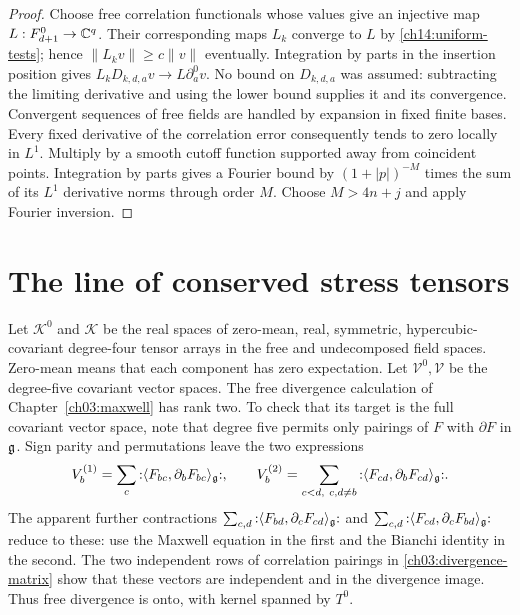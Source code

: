 \begin{proof}
Choose free correlation functionals whose values give an injective map
$L:F_{d+1}^0\to\mathbb C^q$. Their corresponding maps $L_k$
converge to $L$ by \eqref{ch14:uniform-tests}; hence
$\|L_kv\|\ge c\|v\|$ eventually. Integration by parts in the
insertion position gives
$L_k D_{k,d,a}v\to L\partial_a^0v$. No bound on
$D_{k,d,a}$ was assumed: subtracting the limiting derivative and
using the lower bound supplies it and its convergence.
Convergent sequences of free fields are handled by expansion in fixed finite bases.
Every fixed derivative of the correlation error consequently tends
to zero locally in $L^1$. Multiply by a smooth cutoff function supported
away from coincident points. Integration by parts gives a Fourier bound
by $(1+|p|)^{-M}$ times the sum of its $L^1$ derivative norms
through order $M$. Choose $M>4n+j$ and apply Fourier inversion.
\end{proof}

\section{The line of conserved stress tensors}
\label{ch14:stress-line}

Let $\mathcal K^0$ and $\mathcal K$ be the real spaces of zero-mean,
real, symmetric, hypercubic-covariant degree-four tensor arrays in
the free and undecomposed field spaces. Zero-mean means that each component
has zero expectation. Let $\mathcal V^0,\mathcal V$ be the degree-five
covariant vector spaces. The free divergence calculation of Chapter~\ref{ch03:maxwell}
has rank two. To check that its target is the full covariant vector
space, note that degree five permits only pairings of $F$ with $\partial F$ in $\mathfrak g$. Sign parity and permutations leave the two
expressions
\[
 V_b^{(1)}=\sum_c{:}\langle F_{bc},\partial_bF_{bc}\rangle_{\mathfrak g}{:},\qquad
 V_b^{(2)}=\sum_{c<d,\ c,d\ne b}{:}\langle F_{cd},\partial_bF_{cd}\rangle_{\mathfrak g}{:}.
\]
The apparent further contractions
$\sum_{c,d}{:}\langle F_{bd},\partial_cF_{cd}\rangle_{\mathfrak g}{:}$ and
$\sum_{c,d}{:}\langle F_{cd},\partial_cF_{bd}\rangle_{\mathfrak g}{:}$ reduce to these: use the
Maxwell equation in the first and the Bianchi identity in the second.
The two independent rows of correlation pairings in \eqref{ch03:divergence-matrix}
show that these vectors are independent and in the divergence image.
Thus free divergence is onto, with kernel spanned by $T^0$.

